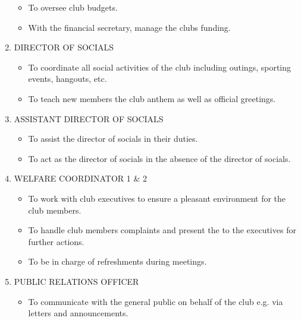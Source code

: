 \documentclass{report}
\begin{document}
\begin{enumerate}
\begin{itemize}
    \item 
    To oversee club budgets.
    
    \item 
    With the financial secretary, manage the clubs funding.

\end{itemize}

    \item DIRECTOR OF SOCIALS
        \begin{itemize}
    \item 
    To coordinate all social activities of the club including outings, sporting events, hangouts, etc.
    
    \item 
    To teach new members the club anthem as well as official greetings.

\end{itemize}

    \item ASSISTANT DIRECTOR OF SOCIALS
        \begin{itemize}
    \item 
    To assist the director of socials in their duties.
    
    \item 
    To act as the director of socials in the absence of the director of socials.

\end{itemize}

    \item WELFARE COORDINATOR 1 \& 2
        \begin{itemize}
    \item 
    To work with club executives to ensure a pleasant environment for the club members.
    
    \item 
    To handle club members complaints and present the to the executives for further actions.
    
    \item 
    To be in charge of refreshments during meetings.

\end{itemize}

    \item PUBLIC RELATIONS OFFICER
        \begin{itemize}
    \item 
    To communicate with the general public on behalf of the club e.g. via letters and announcements.
    

\end{itemize}
\end{enumerate}
\end{document}
